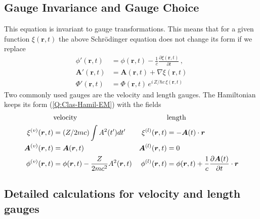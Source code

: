 \subsection{Gauge Invariance and Gauge Choice}
\label{S:gauge-invar-choice}

This equation is invariant to gauge transformations. This means that for a given function $\xi(\bm{r},t)$ the above Schr\"{o}dinger equation does not change its form if we replace
\begin{subequations}
  \begin{align}
    \label{Q:ph-gauge-inv-phi}  \phi'(\bm{r},t) &= \phi(\bm{r},t) - \frac{1}{c} \frac{\partial \xi(\bm{r},t)}{\partial t} \,,\\
    \label{Q:ph-gauge-inv-A}  \bm{A}'(\bm{r},t) &= \bm{A}(\bm{r},t) +  \nabla \xi(\bm{r},t)\\
    \label{Q:ph-gauge-inv-wf} \Phi'(\bm{r},t) &= \Phi(\bm{r},t) \, e^{i\, Z/\hbar c\,
      \xi(\bm{r},t)}
  \end{align}
\end{subequations}
Two commonly used gauges are the velocity and length gauges. The Hamiltonian keeps its form (\ref{Q:Clas-Hamil-EM}) with the fields
\begin{subequations}
  \begin{align}
    &\text{velocity} & &\text{length} \notag \\
    \xi^{(v)}(\bm{r},t)&= (Z/2 m c) \int A^{2}(t') d t' & \xi^{(l)}(\bm{r},t)&= - \bm{A}(t) \cdot \bm{r} \\
    \bm{A}^{(v)}(\bm{r},t)&= \bm{A}(\bm{r},t) & \bm{A}^{(l)}(\bm{r},t) &= 0
    \\
    \phi^{(v)}(\bm{r},t)&= \phi(\bm{r},t) - \frac{Z}{2 m c^{2}} A^{2}(\bm{r},t) &
    \phi^{(l)}(\bm{r},t)&= \phi(\bm{r},t) + \frac{1}{c} \frac{\partial \bm{A}(t)}{\partial
      t} \cdot \bm{r}
  \end{align}
\end{subequations}

\subsection{Detailed calculations for velocity and length gauges}
\label{S:deta-calc-veloc-lengt-gauge}

